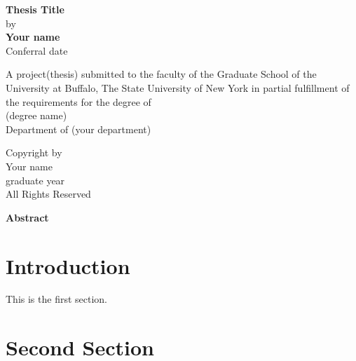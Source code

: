 \documentclass[11pt]{article}
\begin{document}
\begin{titlepage}
    \begin{center}
        \vspace*{1cm}
        \Huge
        \textbf{Thesis Title}\\
        \vspace{0.5cm}
        \LARGE
        \vspace{3cm}
        by\\
        \textbf{Your name}\\
        Conferral date 
        \vfill
        \Large
        \begin{singlespace}
         A project(thesis) submitted to the faculty of the Graduate School of the University at Buffalo, The State University of New York in partial fulfillment of the requirements for the degree of\\
         (degree name) \\
         Department of (your department)
         \end{singlespace}

            
    \end{center}
\end{titlepage}

\begin{center}
    \null\vfill
    \noindent
    Copyright by\\   
    Your name\\
    graduate year \\
    All Rights Reserved
    \newpage
\end{center}


\begin{center}
\LARGE
\textbf{Abstract}
\end{center}
\blindtext
\newpage


\tableofcontents
\newpage
\listoftables
\newpage
\listoffigures
\newpage


\section*{Introduction}

This is the first section.
\blindtext
\blindtext



\section*{Second Section}
\blindtext
\end{document}
